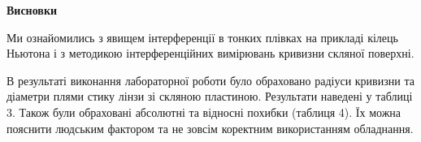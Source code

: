\begin{center}
    \Large{\textbf{Висновки}}    
\end{center}

\vspace{1mm}

Ми ознайомились з явищем інтерференції в тонких плівках
на прикладі кілець Ньютона і з методикою інтерференційних вимірювань
кривизни скляної поверхні.


В результаті виконання лабораторної роботи було обраховано
радіуси кривизни та діаметри плями стику лінзи зі скляною пластиною.
Результати наведені у таблиці 3. Також були обраховані абсолютні та відносні
похибки (таблиця 4). Їх можна пояснити людським фактором та
не зовсім коректним використанням обладнання.
